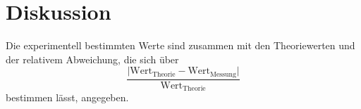 \section{Diskussion}
\label{sec:Diskussion}
Die experimentell bestimmten Werte sind zusammen mit den Theoriewerten und der relativem Abweichung,
die sich über
\begin{equation}
  \frac{\lvert \text{Wert}_{\text{Theorie}}-\text{Wert}_{\text{Messung}}\rvert}{\text{Wert}_{\text{Theorie}}}
  \label{eqn:abw}
\end{equation}
bestimmen lässt, angegeben.
